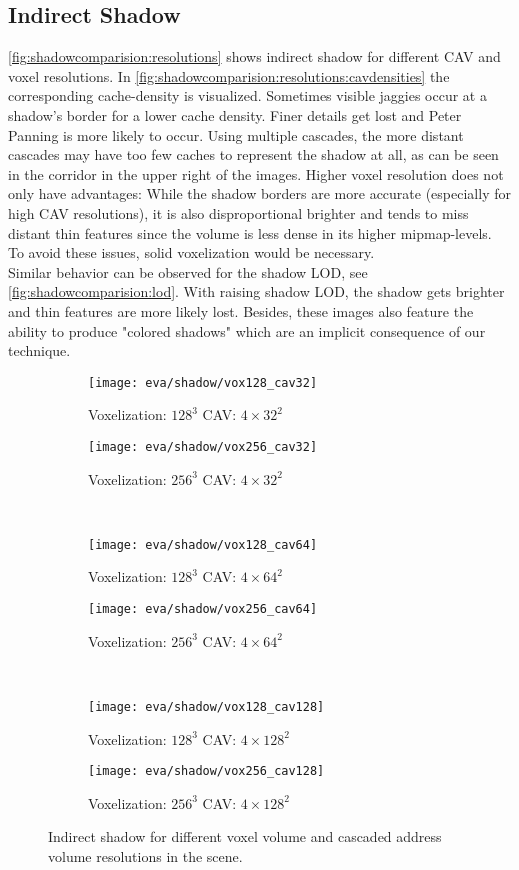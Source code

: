 \documentclass[thesis.tex]{subfiles}
\begin{document}
\subsection{Indirect Shadow}
\autoref{fig:shadowcomparision:resolutions} shows indirect shadow for different CAV and voxel resolutions.
In \autoref{fig:shadowcomparision:resolutions:cavdensities} the corresponding cache-density is visualized.
Sometimes visible jaggies occur at a shadow's border for a lower cache density.
Finer details get lost and Peter Panning is more likely to occur.
Using multiple cascades, the more distant cascades may have too few caches to represent the shadow at all, as can be seen in the corridor in the upper right of the images.
Higher voxel resolution does not only have advantages:
While the shadow borders are more accurate (especially for high CAV resolutions), it is also disproportional brighter and tends to miss distant thin features since the volume is less dense in its higher mipmap-levels.
To avoid these issues, solid voxelization would be necessary.
\\
Similar behavior can be observed for the shadow LOD, see \autoref{fig:shadowcomparision:lod}.
With raising shadow LOD, the shadow gets brighter and thin features are more likely lost.
Besides, these images also feature the ability to produce "colored shadows" which are an implicit consequence of our technique.
%
\begin{figure}
\centering
\begin{subfigure}[b]{\halfpageimage}
\texttt{[image: eva/shadow/vox128\_cav32]}
\caption{Voxelization: $128^3$ CAV: $4\times32^2$}
\end{subfigure}
\begin{subfigure}[b]{\halfpageimage}
\texttt{[image: eva/shadow/vox256\_cav32]}
\caption{Voxelization: $256^3$ CAV: $4\times32^2$}
\end{subfigure}
\\
\begin{subfigure}[b]{\halfpageimage}
\texttt{[image: eva/shadow/vox128\_cav64]}
\caption{Voxelization: $128^3$ CAV: $4\times64^2$}
\end{subfigure}
\begin{subfigure}[b]{\halfpageimage}
\texttt{[image: eva/shadow/vox256\_cav64]}
\caption{Voxelization: $256^3$ CAV: $4\times64^2$}
\end{subfigure}
\\
\begin{subfigure}[b]{\halfpageimage}
\texttt{[image: eva/shadow/vox128\_cav128]}
\caption{Voxelization: $128^3$ CAV: $4\times128^2$}
\end{subfigure}
\begin{subfigure}[b]{\halfpageimage}
\texttt{[image: eva/shadow/vox256\_cav128]}
\caption{Voxelization: $256^3$ CAV: $4\times128^2$}
\end{subfigure}
\caption{Indirect shadow for different voxel volume and cascaded address volume resolutions in the  scene.}
\label{fig:shadowcomparision:resolutions}
\end{figure}
\end{document}
